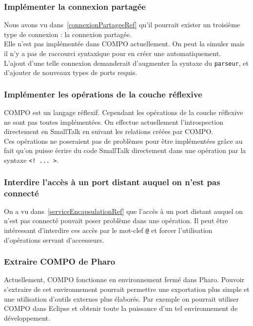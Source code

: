 \documentclass[11pt,a4paper,openany,oneside]{book}
\begin{document}
\subsubsection{Implémenter la connexion partagée}
Nous avons vu dans~\ref{connexionPartageeRef} qu'il pourrait exister un troisième type de connexion : la connexion partagée.\\
Elle n'est pas implémentée dans COMPO actuellement. On peut la simuler mais il n'y a pas de raccourci syntaxique pour en créer une automatiquement.\\
L'ajout d'une telle connexion demanderait d'augmenter la syntaxe du \texttt{parseur}, et d'ajouter de nouveaux types de ports requis.

\subsubsection{Implémenter les opérations de la couche réflexive}
COMPO est un langage réflexif. Cependant les opérations de la couche réflexive ne sont pas toutes implémentées. On effectue actuellement l'introspection directement en SmallTalk en suivant les relations créées par COMPO.\\
Ces opérations ne poseraient pas de problèmes pour être implémentées grâce au fait qu'on puisse écrire du code SmallTalk directement dans une opération par la syntaxe \texttt{<! ... >}.

\subsubsection{Interdire l'accès à un port distant auquel on n'est pas connecté}
On a vu dans~\ref{serviceEncapsulationRef} que l'accès à un port distant auquel on n'est pas connecté pouvait poser problème dans une opération. Il peut être intéressant d'interdire ces accès par le mot-clef \texttt{@} et forcer l'utilisation d'opérations servant d'accesseurs.

\subsubsection{Extraire COMPO de Pharo}
Actuellement, COMPO fonctionne en environnement fermé dans Pharo. Pouvoir s'extraire de cet environnement pourrait permettre une exportation plus simple et une utilisation d'outils externes plus élaborés. Par exemple on pourrait utiliser COMPO dans Eclipse et obtenir toute la puissance d'un tel environnement de développement.


\end{document}
